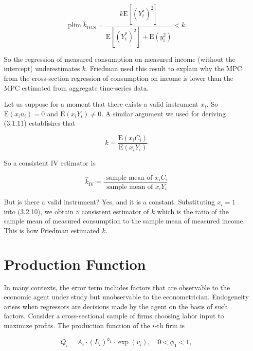 \documentclass[10pt]{article}
\begin{document}
\begin{equation*}
\operatorname{plim} \widehat{k}_{\mathrm{OLS}}=\frac{k \mathrm{E}\left[\left(Y_{i}^{*}\right)^{2}\right]}{\mathrm{E}\left[\left(Y_{i}^{*}\right)^{2}\right]+\mathrm{E}\left(y_{i}^{2}\right)}<k . \tag{3.2.8}
\end{equation*}


So the regression of measured consumption on measured income (without the intercept) underestimates $k$. Friedman used this result to explain why the MPC from the cross-section regression of consumption on income is lower than the MPC estimated from aggregate time-series data.

Let us suppose for a moment that there exists a valid instrument $x_{i}$. So $\mathrm{E}\left(x_{i} u_{i}\right)=0$ and $\mathrm{E}\left(x_{i} Y_{i}\right) \neq 0$. A similar argument we used for deriving (3.1.11) establishes that


\begin{equation*}
k=\frac{\mathrm{E}\left(x_{i} C_{i}\right)}{\mathrm{E}\left(x_{i} Y_{i}\right)} \tag{3.2.9}
\end{equation*}


So a consistent IV estimator is


\begin{equation*}
\widehat{k}_{\mathrm{IV}}=\frac{\text { sample mean of } x_{i} C_{i}}{\text { sample mean of } x_{i} Y_{i}} \tag{3.2.10}
\end{equation*}


But is there a valid instrument? Yes, and it is a constant. Substituting $x_{i}=1$ into (3.2.10), we obtain a consistent estimator of $k$ which is the ratio of the sample mean of measured consumption to the sample mean of measured income. This is how Friedman estimated $k$.

\section*{Production Function}
In many contexts, the error term includes factors that are observable to the economic agent under study but unobservable to the econometrician. Endogeneity arises when regressors are decisions made by the agent on the basis of such factors. Consider a cross-sectional sample of firms choosing labor input to maximize profits. The production function of the $i$-th firm is


\begin{equation*}
Q_{i}=A_{i} \cdot\left(L_{i}\right)^{\phi_{1}} \cdot \exp \left(v_{i}\right), \quad 0<\phi_{1}<1, \tag{3.2.11}
\end{equation*}
\end{document}
